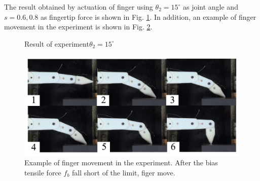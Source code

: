 \documentclass{llncs}
\begin{document}
The result obtained by actuation of finger using $\theta_2=15^{\circ}$ as joint angle 
and $s=0.6,0.8$ as fingertip force 
is shown in Fig. \ref{fig:slack_conclusion}.
In addition, an example of finger movement in the experiment is shown in Fig. \ref{pic:example_slack}.
	\begin{figure}[tb]
	\centering
		\caption{Result of experiment$\theta_2=15^{\circ}$}
		\label{fig:slack_conclusion}
	\end{figure}
	\begin{figure}[tb]
		\centering
		\includegraphics[width=.90\textwidth]{./figure/frame1733r60b180.pdf}
		\caption{Example of finger movement in the experiment. After the bias tensile force $f_b$ fall short of the limit, figer move.}
		\label{pic:example_slack}
	\end{figure}
\end{document}

